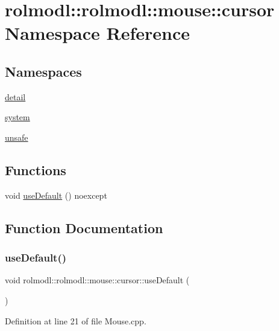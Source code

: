 \hypertarget{namespacerolmodl_1_1rolmodl_1_1mouse_1_1cursor}{}\section{rolmodl\+::rolmodl\+::mouse\+::cursor Namespace Reference}
\label{namespacerolmodl_1_1rolmodl_1_1mouse_1_1cursor}
\subsection*{Namespaces}
\begin{DoxyCompactItemize}
\item 
 \mbox{\hyperlink{namespacerolmodl_1_1rolmodl_1_1mouse_1_1cursor_1_1detail}{detail}}
\item 
 \mbox{\hyperlink{namespacerolmodl_1_1rolmodl_1_1mouse_1_1cursor_1_1system}{system}}
\item 
 \mbox{\hyperlink{namespacerolmodl_1_1rolmodl_1_1mouse_1_1cursor_1_1unsafe}{unsafe}}
\end{DoxyCompactItemize}
\subsection*{Functions}
\begin{DoxyCompactItemize}
\item 
void \mbox{\hyperlink{namespacerolmodl_1_1rolmodl_1_1mouse_1_1cursor_aaf039398eec0442b0188cc71674aa1cb}{use\+Default}} () noexcept
\end{DoxyCompactItemize}


\subsection{Function Documentation}
\mbox{\label{namespacerolmodl_1_1rolmodl_1_1mouse_1_1cursor_aaf039398eec0442b0188cc71674aa1cb}} 
\subsubsection{\texorpdfstring{useDefault()}{useDefault()}}
{\footnotesize\ttfamily void rolmodl\+::rolmodl\+::mouse\+::cursor\+::use\+Default (\begin{DoxyParamCaption}{ }\end{DoxyParamCaption})\hspace{0.3cm}{\ttfamily [noexcept]}}



Definition at line 21 of file Mouse.\+cpp.

